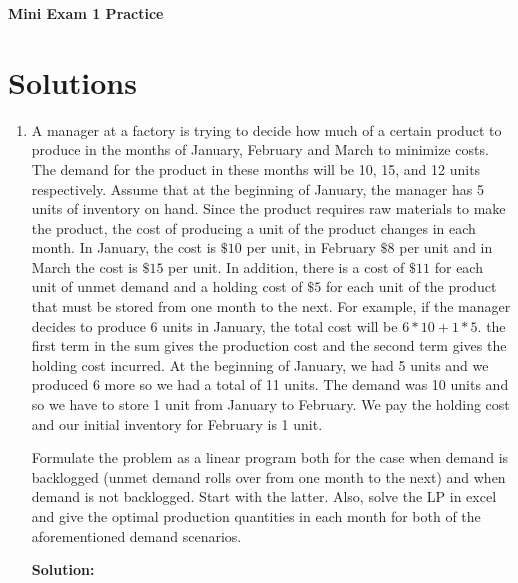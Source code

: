 \documentclass{article}[11 pt]    %
\begin{document}
\begin{center}
\textbf{Mini Exam 1 Practice}\\[.1cm]
\end{center}

\section*{Solutions}

\begin{enumerate}

\item A manager at a factory is trying to decide how much of a certain product to produce in the months of January, February and March to minimize costs.  The demand for the product in these months will be 10, 15, and 12 units respectively.  Assume that at the beginning of January, the manager has 5 units of inventory on hand.  Since the product requires raw materials to make the product, the cost of producing a unit  of the product changes in each month.  In January, the cost is $\$10$ per unit, in February $\$8$ per unit and in March the cost is $\$15$ per unit.  In addition, there is a cost of $\$11$ for each unit of unmet demand and a holding cost of $\$5$ for each unit of the product that must be stored from one month to the next.  For example, if the manager decides to produce 6 units in January, the total cost will be $6*10 + 1*5$.  the first term in the sum gives the production cost and the second term gives the holding cost incurred.  At the beginning of January, we had 5 units and we produced 6 more so we had a total of 11 units.  The demand was 10 units and so we have to store 1 unit from January to February.  We pay the holding cost and our initial inventory for February is 1 unit.  

Formulate the problem as a linear program both for the case when demand is backlogged (unmet demand rolls over from one month to the next) and when demand is not backlogged.  Start with the latter.  Also, solve the LP in excel and give the optimal production quantities in each month for both of the aforementioned demand scenarios. 

\noindent \textbf{Solution:}


\end{enumerate}
\end{document}
